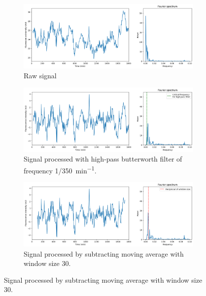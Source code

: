 \begin{figure}
  \centering
  \begin{subfigure}[htpb]{0.8\textwidth}
   \centering
   \includegraphics[width=\textwidth]{fft_raw}
   \caption{
     Raw signal
   }
   \label{fig:analysis-filter-raw}
  \end{subfigure}
  \begin{subfigure}[htpb]{0.8\textwidth}
   \centering
   \includegraphics[width=\textwidth]{fft_butterworth}
   \caption{
     Signal processed with high-pass butterworth filter of frequency \SI[parse-numbers=false]{1/350}{\minute^{-1}}.
   }
   \label{fig:analysis-filter-butterworth}
  \end{subfigure}
  \begin{subfigure}[htpb]{0.8\textwidth}
   \centering
   \includegraphics[width=\textwidth]{fft_slidingwindow}
   \caption{
     Signal processed by subtracting moving average with window size 30.
   }
   \label{fig:analysis-filter-slidingwindow}
  \end{subfigure}

\end{figure}
